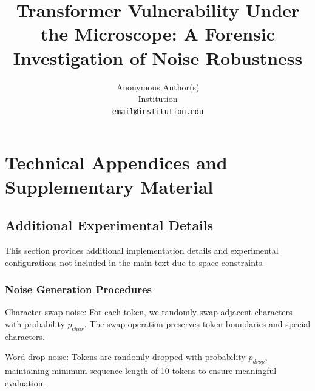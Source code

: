 \documentclass{article}
\title{Transformer Vulnerability Under the Microscope: A Forensic Investigation of Noise Robustness}
\author{%
  Anonymous Author(s)\\
  Institution\\
  \texttt{email@institution.edu}
}
\begin{document}
\maketitle





















\appendix

\section{Technical Appendices and Supplementary Material}

\subsection{Additional Experimental Details}

This section provides additional implementation details and experimental configurations not included in the main text due to space constraints.

\subsubsection{Noise Generation Procedures}

Character swap noise: For each token, we randomly swap adjacent characters with probability $p_{char}$. The swap operation preserves token boundaries and special characters.

Word drop noise: Tokens are randomly dropped with probability $p_{drop}$, maintaining minimum sequence length of 10 tokens to ensure meaningful evaluation.
\end{document}
